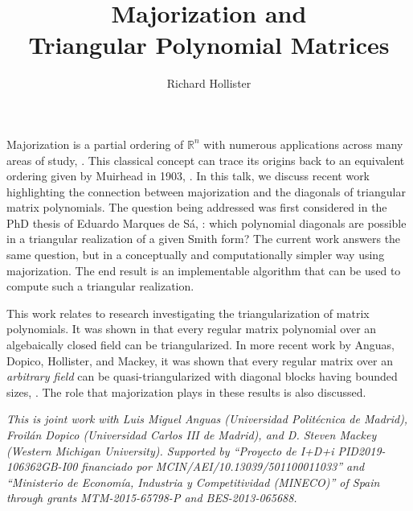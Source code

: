 \documentclass[a4paper]{amsart}
\date{}
\begin{document}
\title{Majorization and \\ Triangular Polynomial Matrices}
\author{Richard Hollister} %
\address{University at Buffalo} %

\maketitle


Majorization is a partial ordering of $ \mathbb{R}^n $ with numerous applications across many areas of study, \cite{Marshall-Olkin-I:TMA,Arnold-MHTE}.  This classical concept can trace its origins back to an equivalent ordering given by Muirhead in 1903, \cite{Muirhead-SAFA}.  In this talk, we discuss recent work highlighting the connection between majorization and the diagonals of triangular matrix polynomials.  The question being addressed was first considered in the PhD thesis of Eduardo Marques de S\'a, \cite{MarquesdeSa-IMEFI}:  which polynomial diagonals are possible in a triangular realization of a given Smith form?  The current work answers the same question, but in a conceptually and computationally simpler way using majorization.  The end result is an implementable algorithm that can be used to compute such a triangular realization.

This work relates to research investigating the triangularization of matrix polynomials.  It was shown in \cite{TTZ-TMP} that every regular matrix polynomial over an algebaically closed field can be triangularized.  In more recent work by Anguas, Dopico, Hollister, and Mackey, it was shown that every regular matrix over an \emph{arbitrary field} can be quasi-triangularized with diagonal blocks having bounded sizes, \cite{ADHM-QRMP}.  The role that majorization plays in these results is also discussed.

\emph{This is joint work with Luis Miguel Anguas (Universidad Polit\'ecnica de Madrid), Froil\'{a}n Dopico (Universidad Carlos III de Madrid), and D. Steven Mackey (Western Michigan University).
Supported by ``Proyecto de I+D+i PID2019-106362GB-I00 financiado por MCIN/AEI/10.13039/501100011033'' and ``Ministerio de Econom\'ia, Industria y Competitividad (MINECO)'' of Spain through grants MTM-2015-65798-P and BES-2013-065688.}
\end{document}
